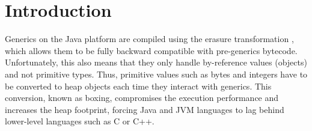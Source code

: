 \section{Introduction}
\label{mbox2:sec:intro}

Generics on the Java platform are compiled using the erasure transformation \cite{java-erasure}, which allows them to be fully backward compatible with pre-generics bytecode. Unfortunately, this also means that they only handle by-reference values (objects) and not primitive types. Thus, primitive values such as bytes and integers have to be converted to heap objects each time they interact with generics. This conversion, known as boxing, compromises the execution performance and increases the heap footprint, forcing Java and JVM languages to lag behind lower-level languages such as C or C++.


